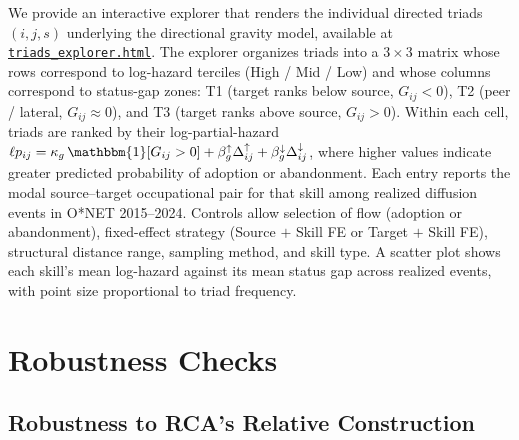 \documentclass[11pt, letterpaper]{article} %
\begin{document}
We provide an interactive explorer that renders the individual directed triads $(i, j, s)$ underlying the directional gravity model, available at \href{https://anonymous.4open.science/w/skill_diffusion_replication-7857/triads_explorer.html}{\nolinkurl{triads_explorer.html}}.
The explorer organizes triads into a $3 \times 3$ matrix whose rows correspond to log-hazard terciles (High / Mid / Low) and whose columns correspond to status-gap zones: T1 (target ranks below source, $G_{ij} < 0$), T2 (peer / lateral, $G_{ij} \approx 0$), and T3 (target ranks above source, $G_{ij} > 0$). Within each cell, triads are ranked by their log-partial-hazard $\ell p_{ij} = \kappa_{g}\,\mathbbm{1}[G_{ij}>0] + \beta^{\uparrow}_{g}\Delta^{\uparrow}_{ij} + \beta^{\downarrow}_{g}\Delta^{\downarrow}_{ij}$, where higher values indicate greater predicted probability of adoption or abandonment. Each entry reports the modal source--target occupational pair for that skill among realized diffusion events in O*NET 2015--2024. Controls allow selection of flow (adoption or abandonment), fixed-effect strategy (Source $+$ Skill FE or Target $+$ Skill FE), structural distance range, sampling method, and skill type. A scatter plot shows each skill's mean log-hazard against its mean status gap across realized events, with point size proportional to triad frequency.

\section{Robustness Checks}

\subsection{Robustness to RCA's Relative Construction}
\label{sec:SI_rca_denom}
\end{document}
